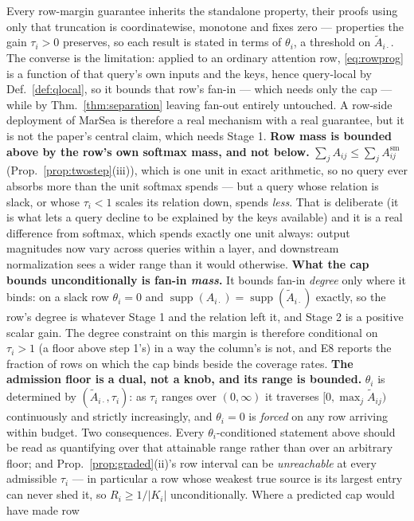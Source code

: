 \documentclass{article}
\newcommand{\supp}{\operatorname{supp}}
\begin{document}
Every row-margin guarantee inherits the standalone property, their proofs using only
that truncation is coordinatewise, monotone and fixes zero --- properties the gain $\tau_i>0$
preserves, so each result is stated in terms of $\theta_i$, a threshold on $\tilde A_{i\cdot}$.
The converse is the limitation: applied to an ordinary attention row, \eqref{eq:rowprog} is a
function of that query's own inputs and the keys, hence query-local by Def.~\ref{def:qlocal}, so
it bounds that row's fan-in --- which needs only the cap --- while by Thm.~\ref{thm:separation}
leaving fan-out entirely untouched.
A row-side deployment of MarSea is therefore a real mechanism with a real guarantee, but it is not
the paper's central claim, which needs Stage 1.
\textbf{Row mass is bounded above by the row's own softmax mass, and not below.}
$\sum_jA_{ij}\le\sum_jA^{\mathrm{sm}}_{ij}$ (Prop.~\ref{prop:twostep}(iii)), which is one unit in
exact arithmetic, so no query ever absorbs more than the unit softmax spends --- but a query whose relation is slack, or whose $\tau_i<1$ scales its relation
down, spends \emph{less}. That is deliberate (it is what lets a query decline to be explained by the keys
available) and it is a real difference from softmax, which spends exactly one unit always: output
magnitudes now vary across queries within a layer, and downstream normalization sees a wider
range than it would otherwise. \textbf{What the cap bounds unconditionally is fan-in
\emph{mass}.} It bounds fan-in \emph{degree} only where it binds: on a slack row $\theta_i=0$ and
$\supp(A_{i\cdot})=\supp(\tilde A_{i\cdot})$ exactly, so the row's degree is whatever Stage 1 and
the relation left it, and Stage 2 is a positive scalar gain. The degree constraint on this margin is
therefore conditional on $\tau_i>1$ (a floor above step 1's) in a way the column's is not, and E8 reports the
fraction of rows on which the cap binds beside the coverage rates.
\textbf{The admission floor is a dual, not a knob, and its range is bounded.} $\theta_i$ is
determined by $(\tilde A_{i\cdot},\tau_i)$: as $\tau_i$ ranges over $(0,\infty)$ it traverses
$[0,\max_j\tilde A_{ij})$ continuously and strictly increasingly, and $\theta_i=0$ is
\emph{forced} on any row arriving within budget. Two consequences. Every $\theta_i$-conditioned
statement above should be read as quantifying over that attainable range rather than over an
arbitrary floor; and Prop.~\ref{prop:graded}(ii)'s row interval can be \emph{unreachable} at
every admissible $\tau_i$ --- in particular a row whose weakest true source is its largest entry
can never shed it, so $R_i\ge1/|K_i|$ unconditionally. Where a predicted cap would have made row
\end{document}
